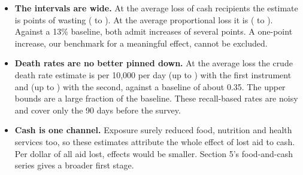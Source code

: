 \documentclass[11pt]{article}
\begin{document}
\begin{itemize}
  \item \textbf{The intervals are wide.} At the average loss of cash recipients the estimate is \nivAtMeanReachIdxGam{} points of wasting (\nivAtMeanLoReachIdxGam{} to \nivAtMeanHiReachIdxGam). At the average proportional loss it is \nivAtMeanLogUsGam{} (\nivAtMeanLoLogUsGam{} to \nivAtMeanHiLogUsGam). Against a 13\% baseline, both admit increases of several points. A one-point increase, our benchmark for a meaningful effect, cannot be excluded.
  \item \textbf{Death rates are no better pinned down.} At the average loss the crude death rate estimate is \nivAtMeanReachIdxCdr{} per 10,000 per day (up to \nivAtMeanHiReachIdxCdr) with the first instrument and \nivAtMeanLogUsCdr{} (up to \nivAtMeanHiLogUsCdr) with the second, against a baseline of about 0.35. The upper bounds are a large fraction of the baseline. These recall-based rates are noisy and cover only the 90 days before the survey.
  \item \textbf{Cash is one channel.} Exposure surely reduced food, nutrition and health services too, so these estimates attribute the whole effect of lost aid to cash. Per dollar of all aid lost, effects would be smaller. Section 5's food-and-cash series gives a broader first stage.
\end{itemize}
\end{document}
